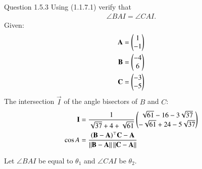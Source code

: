 \documentclass[journal,12pt,twocolumn]{IEEEtran}
\theoremstyle{remark}
\begin{document}
Question 1.5.3
Using (1.1.7.1) verify that 
\begin{align}\angle BAI = \angle CAI.\end{align}
Given:
\begin{align}
\mathbf{A} = \begin{pmatrix}1\\-1\end{pmatrix}\\
\mathbf{B} = \begin{pmatrix}-4\\6\end{pmatrix}\\
\mathbf{C} = \begin{pmatrix}-3\\-5\end{pmatrix}
\end{align}
The intersection $\vec{I}$ of the angle bisectors of $B$ and $C$:
\begin{align}
\mathbf{I} &= \frac{1}{\sqrt{37}+ 4 +\sqrt{61}}\begin{pmatrix}
{\sqrt{61}-16-3\sqrt{37}}\\
{-\sqrt{61}+24-5\sqrt{37}}
\end{pmatrix}\\
\cos{A} &= \frac{(\mathbf{B} - \mathbf{A})^{\top}\mathbf{C} - \mathbf{A}}{\left\lVert\mathbf{B} - \mathbf{A}\right\rVert \left\lVert \mathbf{C} - \mathbf{A}\right\rVert}
\end{align}

\solution

Let $\angle BAI$ be equal to $\theta_1$ and $\angle CAI$ be $\theta_2$.
\end{document}
